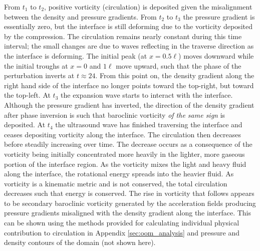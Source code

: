 \documentclass{jfm}%
\begin{document}
From $t_1$ to $t_2$, positive vorticity (circulation) is deposited
given the misalignment between the density and pressure
gradients. From $t_2$ to $t_3$ the pressure gradient is essentially
zero, but the interface is still deforming due to the vorticity
deposited by the compression. The circulation remains nearly constant
during this time interval; the small changes are due to waves
reflecting in the traverse direction as the interface is
deforming. The initial peak (at $x=0.5\ell$) moves downward while the
initial troughs at $x=0$ and $1\ell$ move upward, such that the phase
of the perturbation inverts at $t \approx 24$. From this point on, the
density gradient along the right hand side of the interface no longer
points toward the top-right, but toward the top-left. At $t_3$ the
expansion wave starts to interact with the interface. Although the
pressure gradient has inverted, the direction of the density gradient
after phase inversion is such that baroclinic vorticity \emph{of the
  same sign} is deposited. At $t_4$ the ultrasound wave has finished
traversing the interface and ceases depositing vorticity along the
interface. The circulation then decreases before steadily increasing
over time. The decrease occurs as a consequence of the vorticity being
initially concentrated more heavily in the lighter, more gaseous
portion of the interface region. As the vorticity mixes the light and
heavy fluid along the interface, the rotational energy spreads into
the heavier fluid. As vorticity is a kinematic metric and is not
conserved, the total circulation decreases such that energy is
conserved. The rise in vorticity that follows appears to be secondary
baroclinic vorticity generated by the acceleration fields producing
pressure gradients misaligned with the density gradient along the
interface. This can be shown using the methods provided for
calculating individual physical contribution to circulation in
Appendix \ref{sec:oom_analysis} and pressure and density contours of
the domain (not shown here).
\end{document}
